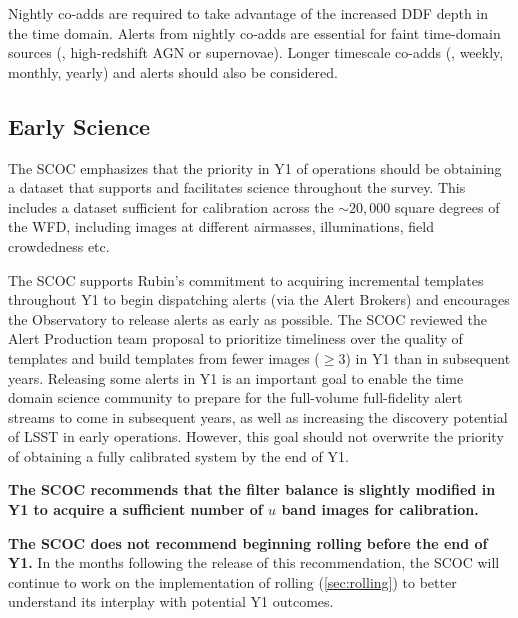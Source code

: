 Nightly co-adds are required to take advantage of the increased DDF depth in the time domain. Alerts from nightly co-adds are essential for faint time-domain sources (\eg , high-redshift AGN or supernovae). Longer timescale co-adds (\eg , weekly, monthly, yearly) and alerts should also be considered.





\FloatBarrier

\subsection{Early Science}\label{sec:early}

 The SCOC emphasizes that the priority in Y1 of operations should be obtaining a dataset that supports and facilitates science throughout the survey. This includes a dataset sufficient for calibration across the $\sim 20,000$ square degrees of the WFD, including images at different airmasses, illuminations, field crowdedness etc. 
 
 The SCOC supports Rubin's commitment to acquiring incremental templates throughout Y1 to begin dispatching alerts (via the Alert Brokers) and encourages the Observatory to release alerts as early as possible. The SCOC reviewed the Alert Production team proposal to prioritize timeliness over the quality of templates and build templates from fewer images ($\geq 3$) in Y1 than in subsequent years. Releasing some alerts in Y1 is an important goal to enable the time domain science community to prepare for the full-volume full-fidelity alert streams to come in subsequent years, as well as increasing the discovery potential of LSST in early operations. However, this goal should not overwrite the priority of obtaining a fully calibrated system by the end of Y1.

 {\bf The SCOC recommends that the filter balance is slightly modified in Y1 to acquire a sufficient number of $u$ band images for calibration. }

 {\bf The SCOC does not recommend beginning rolling before the end of Y1.} In the months following the release of this recommendation, the SCOC will continue to work on the implementation of rolling (\autoref{sec:rolling}) to better understand its interplay with potential Y1 outcomes. 


\FloatBarrier



